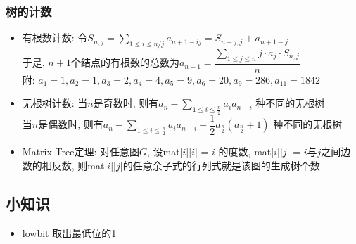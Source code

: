 \documentclass[landscape,a4paper]{article}
\begin{document}
\begin{spacing}{0.3}
\begin{multicols}{2}
\subsubsection{树的计数}
\begin{itemize}
\item 有根数计数: 令$S_{n, j} = \sum\limits_{1 \le i \le n / j} a_{n + 1 - ij} = S_{n - j, j} + a_{n + 1 - j}$\\
  于是, $n + 1$个结点的有根数的总数为$a_{n + 1} = \dfrac{\sum\limits_{1 \le j \le n} j \cdot a_j \cdot S_{n, j} }{n}$\\
  附: $a_1 = 1, a_2 = 1, a_3 = 2, a_4 = 4, a_5 = 9, a_6 = 20, a_9 = 286, a_{11} = 1842$
\item 无根树计数: 当$n$是奇数时, 则有$a_n - \sum\limits_{1 \le i \le \frac{n}{2}} a_i a_{n - i}$ 种不同的无根树\\
  当$n$是偶数时, 则有$a_n - \sum\limits_{1 \le i \le \frac{n}{2}} a_i a_{n - i} + \dfrac{1}{2} a_\frac{n}{2} (a_\frac{n}{2} + 1)$ 种不同的无根树
\item Matrix-Tree定理: 对任意图$G$, 设mat[$i$][$i$] = $i$ 的度数, mat[$i$][$j$] = $i$与$j$之间边数的相反数, 则mat[$i$][$j$]的任意余子式的行列式就是该图的生成树个数
\end{itemize}

\subsection{小知识}
\begin{itemize}	

\item lowbit 取出最低位的1


\end{itemize}
\end{multicols}
\end{spacing}
\end{document}
